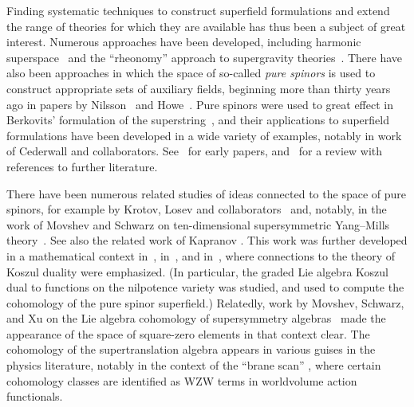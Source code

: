 \documentclass[pdftex]{sigma}
\numberwithin{equation}{section}
\begin{document}
Finding systematic techniques to construct superfield formulations and extend the range of theories for which they are available has thus been a subject of great interest. Numerous approaches have been developed, including harmonic superspace~\cite{HSbook} and the ``rheonomy'' approach to supergravity theories~\cite{CdAF}. There have also been approaches in which the space of so-called \emph{pure spinors} is used to construct appropriate sets of auxiliary fields, beginning more than thirty years ago in papers by Nilsson~\cite{Nilsson} and Howe~\cite{HowePS1,HowePS2}. Pure spinors were used to great effect in Berkovits' formulation of the superstring~\cite{Berkovits}, and their applications to superfield formulations have been developed in a wide variety of examples, notably in work of Cederwall and collaborators. See~\cite{character, CNT2, CederwallM5} for early papers, and~\cite{Cederwall} for a review with references to further literature.

There have been numerous related studies of ideas connected to the space of pure spinors, for example by Krotov, Losev and collaborators~\cite{AKLL,KroLoCS} and, notably, in the work of Movshev and Schwarz on ten-dimensional supersymmetric Yang--Mills theory~\cite{Mov1,Mov2,MovshevGeometryPureSpinor, MS1,MS2}. See also the related work of Kapranov \cite{KapranovSuper}. This work was further developed in a mathematical context in~\cite{GKR}, in~\cite{GS}, and in~\cite{GGST}, where connections to the theory of Koszul duality were emphasized.
(In particular, the graded Lie algebra Koszul dual to functions on the nilpotence variety was studied, and used to compute the cohomology of the pure spinor superfield.)
Relatedly, work by Movshev, Schwarz, and Xu on the Lie algebra cohomology of supersymmetry algebras~\cite{MSX1,MSX2} made the appearance of the space of square-zero elements in that context clear. The cohomology of the supertranslation algebra appears in various guises in the physics literature, notably in the context of the ``brane scan'' \cite{OBS, FSS, HuertaThesis}, where certain cohomology classes are identified as WZW terms in worldvolume action functionals.
\end{document}
